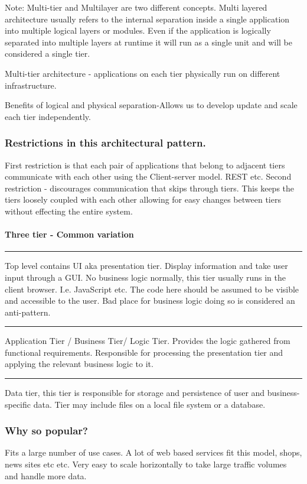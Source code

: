 \documentclass[a4paper, 11pt]{book}
\begin{document}
    Note: Multi-tier and Multilayer are two different concepts.
    Multi layered architecture usually refers to the internal separation inside a single application into multiple logical layers or modules.
    Even if the application is logically separated into multiple layers at runtime it will run as a single unit and will be considered a single tier.

    Multi-tier architecture - applications on each tier physically run on different infrastructure.

    Benefits of logical and physical separation-Allows us to develop update and scale each tier independently.

    \subsubsection{Restrictions in this architectural pattern.}
    First restriction is that each pair of applications that belong to adjacent tiers communicate with each other using the Client-server model.
    REST etc.
    Second restriction - discourages communication that skips through tiers.
    This keeps the tiers loosely coupled with each other allowing for easy changes between tiers without effecting the entire system.

    \paragraph{Three tier - Common variation}
    \hrule
    Top level contains UI aka presentation tier.
    Display information and take user input through a GUI\@.
    No business logic normally, this tier usually runs in the client browser.
    I.e. JavaScript etc.
    The code here should be assumed to be visible and accessible to the user.
    Bad place for business logic doing so is considered an anti-pattern.
    \hrule
    Application Tier / Business Tier/ Logic Tier.
    Provides the logic gathered from functional requirements.
    Responsible for processing the presentation tier and applying the relevant business logic to it.
    \hrule
    Data tier, this tier is responsible for storage and persistence of user and business-specific data.
    Tier may include files on a local file system or a database.

    \subsubsection{Why so popular?}
    Fits a large number of use cases.
    A lot of web based services fit this model, shops, news sites etc etc.
    Very easy to scale horizontally to take large traffic volumes and handle more data.
\end{document}
